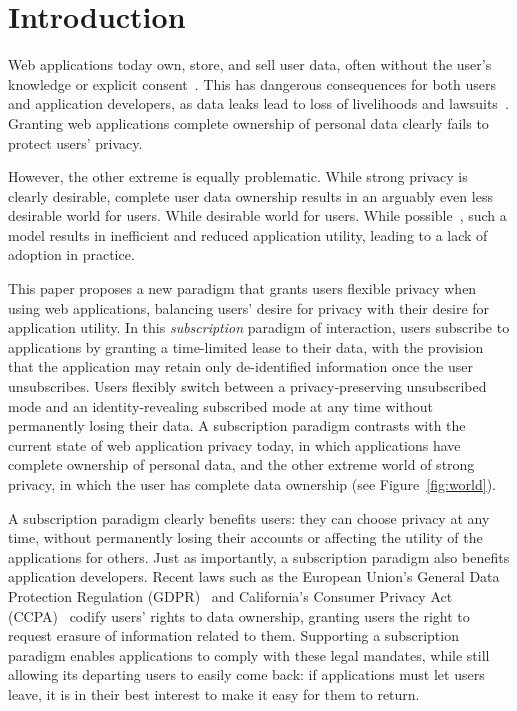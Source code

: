 \section{Introduction}

Web applications today own, store, and sell user data, often without the user's knowledge or
explicit consent~\cite{nytimes:fb, npr:data}. This has dangerous consequences for both users and
application developers, as data leaks lead to loss of livelihoods and
lawsuits~\cite{breach:amazon,breach:twitter, breach:fb, breach:marriott, breach:quora}. Granting web
applications complete ownership of personal data clearly fails to protect users' privacy. 

However, the other extreme is equally problematic.  While strong privacy is clearly desirable,
complete user data ownership results in an arguably even less desirable world for users. While
desirable world for users. While possible~\cite{amber, w5, blockstack, bstore}, such a model results
in inefficient and reduced application utility, leading to a lack of adoption in practice.  

This paper proposes a new paradigm that grants users flexible privacy when using web
applications, balancing users' desire for privacy with their desire for application utility. In this \emph{subscription} paradigm of interaction, users subscribe to applications by granting a time-limited
lease to their data, with the provision that the application may retain only de-identified
information once the user unsubscribes. Users flexibly switch between a privacy-preserving
unsubscribed mode and an identity-revealing subscribed mode at any time without permanently losing
their data. 
A subscription paradigm contrasts with the current state of web application privacy today,
in which applications have complete ownership of personal data, and the other extreme world of
strong privacy, in which the user has complete data ownership (see Figure~\ref{fig:world}). 

A subscription paradigm clearly benefits users: they can choose privacy at any time, without permanently
losing their accounts or affecting the utility of the applications for others.
Just as importantly, a subscription paradigm  also benefits application developers. Recent laws
such as the European Union's General Data Protection Regulation (GDPR)~\cite{eu:gdpr} and
California's Consumer Privacy Act (CCPA)~\cite{ca:privacy-act} codify users' rights to data
ownership, granting users the right to request erasure of information related to them. Supporting
a subscription paradigm enables applications to comply with these legal mandates, while still allowing its departing users
to easily come back: if applications must let users leave, it is in their best interest to make it
easy for them to return.  

